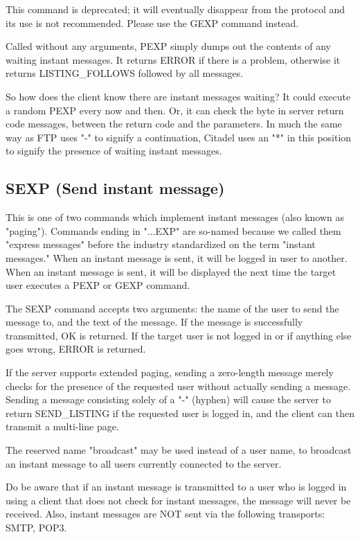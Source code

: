  This command is deprecated; it will eventually disappear from the protocol and
its use is not recommended.  Please use the GEXP command instead.

 Called without any arguments, PEXP simply dumps out the contents
of any waiting instant messages.  It returns ERROR if there is a problem,
otherwise it returns LISTING_FOLLOWS followed by all messages.

 So how does the client know there are instant messages waiting?  It could
execute a random PEXP every now and then.  Or, it can check the byte in
server return code messages, between the return code and the parameters.  In
much the same way as FTP uses "-" to signify a continuation, Citadel uses
an "*" in this position to signify the presence of waiting instant messages.



\subsection{SEXP (Send instant message)}

 This is one of two commands which implement instant messages (also known
as "paging").  Commands ending in "...EXP" are so-named because we called
them "express messages" before the industry standardized on the term
"instant messages."  When an instant message is sent, it will be
logged in user to another.  When an instant message is sent, it will be
displayed the next time the target user executes a PEXP or GEXP command.

 The SEXP command accepts two arguments: the name of the user to send the
message to, and the text of the message.  If the message is successfully
transmitted, OK is returned.  If the target user is not logged in or if
anything else goes wrong, ERROR is returned.

 If the server supports extended paging, sending a zero-length message
merely checks for the presence of the requested user without actually sending
a message.  Sending a message consisting solely of a "-" (hyphen) will cause
the server to return SEND_LISTING if the requested user is logged in, and the
client can then transmit a multi-line page.

 The reserved name "broadcast" may be used instead of a user name, to
broadcast an instant message to all users currently connected to the server.

 Do be aware that if an instant message is transmitted to a user who is logged
in using a client that does not check for instant messages, the message will
never be received.  Also, instant messages are NOT sent via the following
transports:  SMTP, POP3.


